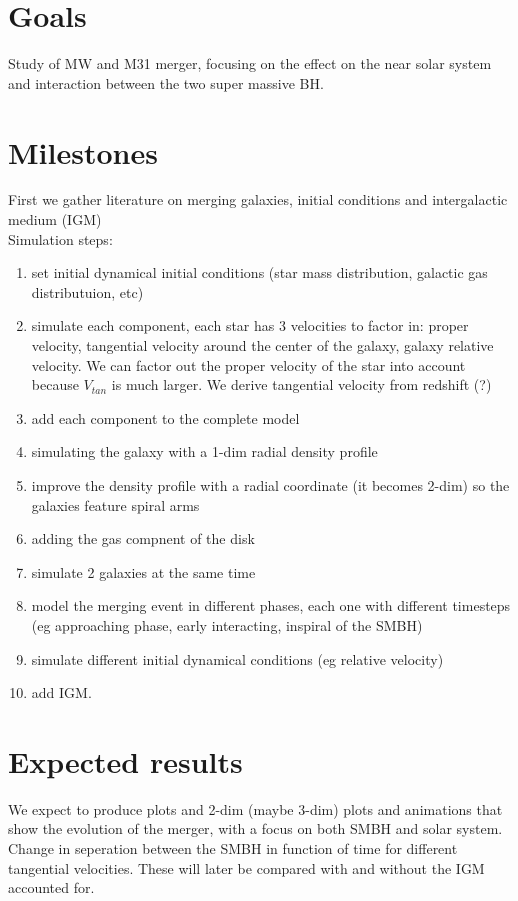 \documentclass[11pt, english]{article}
\begin{document}
\section{Goals}
Study of MW and M31 merger, focusing on the effect on the near solar system and interaction between the two super massive BH.

\section{Milestones}

First we gather literature on merging galaxies, initial conditions and intergalactic medium (IGM)\\
Simulation steps:\\
\begin{enumerate}
 
\item set initial dynamical initial conditions (star mass distribution, galactic gas distributuion, etc)
\item  simulate each component, each star has 3 velocities to factor in: proper velocity, tangential velocity around the center of the galaxy, galaxy relative velocity. We can factor out the proper velocity of the star into account because \(V_{tan}\) is much larger. We derive tangential velocity from redshift (?)
\item  add each component to the complete model
\item  simulating the galaxy with a 1-dim radial density profile
\item  improve the density profile with a radial coordinate (it becomes 2-dim) so the galaxies feature spiral arms
\item  adding the gas compnent of the disk
\item  simulate 2 galaxies at the same time
\item  model the merging event in different phases, each one with different timesteps (eg approaching phase, early interacting, inspiral of the SMBH)
\item  simulate different initial dynamical conditions (eg relative velocity)
\item  add IGM.

\end{enumerate}
\section{Expected results}

We expect to produce plots and 2-dim (maybe 3-dim) plots and animations that show the evolution of the merger, with a focus on both SMBH and solar system.
Change in seperation between the SMBH in function of time for different tangential velocities. These will later be compared with and without the IGM accounted for.
\end{document}
